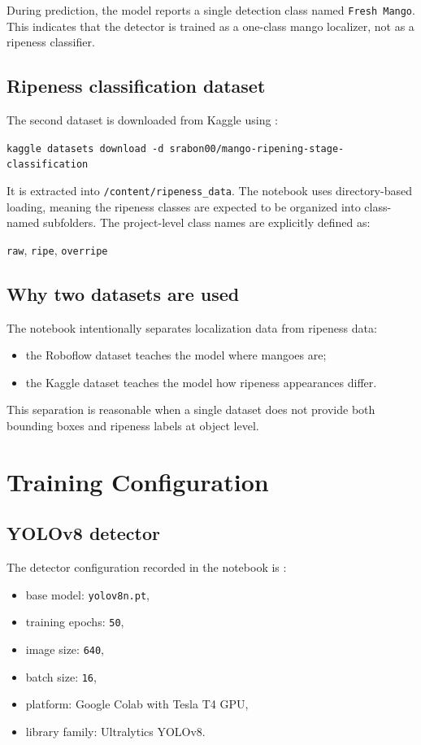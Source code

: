 \documentclass[12pt,a4paper]{article}
\begin{document}
During prediction, the model reports a single detection class named \texttt{Fresh Mango}. This indicates that the detector is trained as a one-class mango localizer, not as a ripeness classifier.

\subsection{Ripeness classification dataset}
The second dataset is downloaded from Kaggle using \cite{kaggledataset}:
\begin{center}
\texttt{kaggle datasets download -d srabon00/mango-ripening-stage-classification}
\end{center}

It is extracted into \texttt{/content/ripeness\_data}. The notebook uses directory-based loading, meaning the ripeness classes are expected to be organized into class-named subfolders. The project-level class names are explicitly defined as:
\begin{center}
\texttt{raw}, \texttt{ripe}, \texttt{overripe}
\end{center}

\subsection{Why two datasets are used}
The notebook intentionally separates localization data from ripeness data:
\begin{itemize}
    \item the Roboflow dataset teaches the model where mangoes are;
    \item the Kaggle dataset teaches the model how ripeness appearances differ.
\end{itemize}

This separation is reasonable when a single dataset does not provide both bounding boxes and ripeness labels at object level.

\section{Training Configuration}
\subsection{YOLOv8 detector}
The detector configuration recorded in the notebook is \cite{ultralytics}:
\begin{itemize}
    \item base model: \texttt{yolov8n.pt},
    \item training epochs: \texttt{50},
    \item image size: \texttt{640},
    \item batch size: \texttt{16},
    \item platform: Google Colab with Tesla T4 GPU,
    \item library family: Ultralytics YOLOv8.
\end{itemize}
\end{document}
